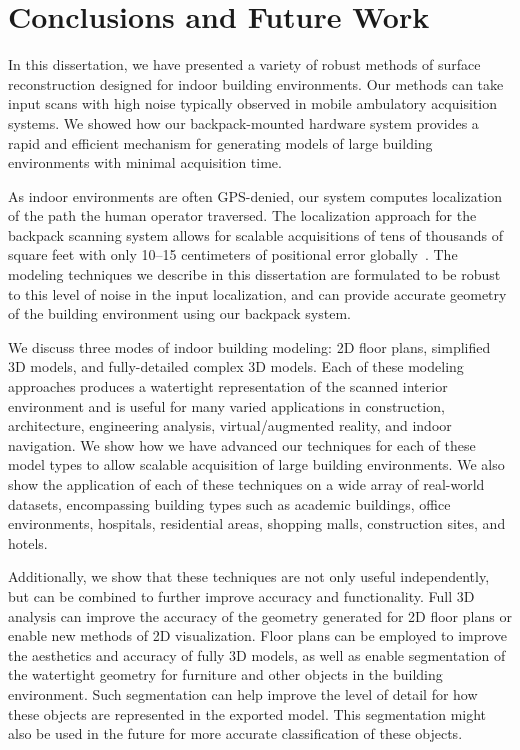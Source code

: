 \documentclass[12pt,onecolumn,oneside]{book}
\begin{document}
\chapter{Conclusions and Future Work}
\label{ch:conclusion}

In this dissertation, we have presented a variety of robust methods of surface reconstruction designed for indoor building environments.  Our methods can take input scans with high noise typically observed in mobile ambulatory acquisition systems.  We showed how our backpack-mounted hardware system provides a rapid and efficient mechanism for generating models of large building environments with minimal acquisition time.

As indoor environments are often GPS-denied, our system computes localization of the path the human operator traversed.  The localization approach for the backpack scanning system allows for scalable acquisitions of tens of thousands of square feet with only 10--15 centimeters of positional error globally~\cite{Localization,NickJournal}.  The modeling techniques we describe in this dissertation are formulated to be robust to this level of noise in the input localization, and can provide accurate geometry of the building environment using our backpack system.

We discuss three modes of indoor building modeling:  2D floor plans, simplified 3D models, and fully-detailed complex 3D models.  Each of these modeling approaches produces a watertight representation of the scanned interior environment and is useful for many varied applications in construction, architecture, engineering analysis, virtual/augmented reality, and indoor navigation.  We show how we have advanced our techniques for each of these model types to allow scalable acquisition of large building environments.  We also show the application of each of these techniques on a wide array of real-world datasets, encompassing building types such as academic buildings, office environments, hospitals, residential areas, shopping malls, construction sites, and hotels.

Additionally, we show that these techniques are not only useful independently, but can be combined to further improve accuracy and functionality.  Full 3D analysis can improve the accuracy of the geometry generated for 2D floor plans or enable new methods of 2D visualization.  Floor plans can be employed to improve the aesthetics and accuracy of fully 3D models, as well as enable segmentation of the watertight geometry for furniture and other objects in the building environment.  Such segmentation can help improve the level of detail for how these objects are represented in the exported model.  This segmentation might also be used in the future for more accurate classification of these objects.  
\end{document}
